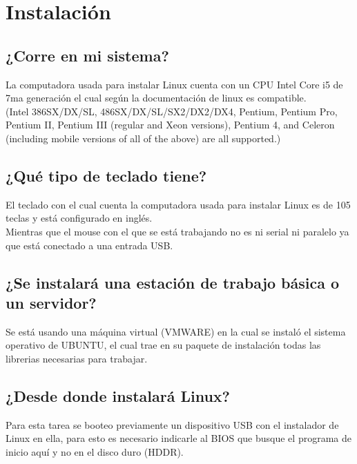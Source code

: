 \documentclass[
  letterpaper, 
  maincolor=black,
  sectioncolor=black!90,
  subsectioncolor=black!70,
  itemtextcolor=black!40,
]{fortysecondscv}
\begin{document}
\makefrontsidebar



\section{Instalación}
\subsection{¿Corre en mi sistema?}
    La computadora usada para instalar Linux cuenta con un CPU Intel Core i5 de 7ma generación el cual según la documentación de linux es compatible. \\
    (Intel 386SX/DX/SL, 486SX/DX/SL/SX2/DX2/DX4, Pentium, Pentium Pro, Pentium II, Pentium III (regular and Xeon versions), Pentium 4, and Celeron (including mobile versions of all of the above) are all supported.)
\subsection{¿Qué tipo de teclado tiene?}
    El teclado con el cual cuenta la computadora usada para instalar Linux es de 105 teclas y está configurado en inglés.\\
    Mientras que el mouse con el que se está trabajando no es ni serial ni paralelo ya que está conectado a una entrada USB. 
\subsection{¿Se instalará una estación de trabajo básica o un servidor?}
    Se está usando una máquina virtual (VMWARE) en la cual se instaló el sistema operativo de UBUNTU, el cual trae en su paquete de instalación todas las librerias necesarias para trabajar.
 
\subsection{¿Desde donde instalará Linux?}
    Para esta tarea se booteo previamente un dispositivo USB con el instalador de Linux en ella, para esto es necesario indicarle al BIOS que busque el programa de inicio aquí y no en el disco duro (HDDR). 
\end{document}

